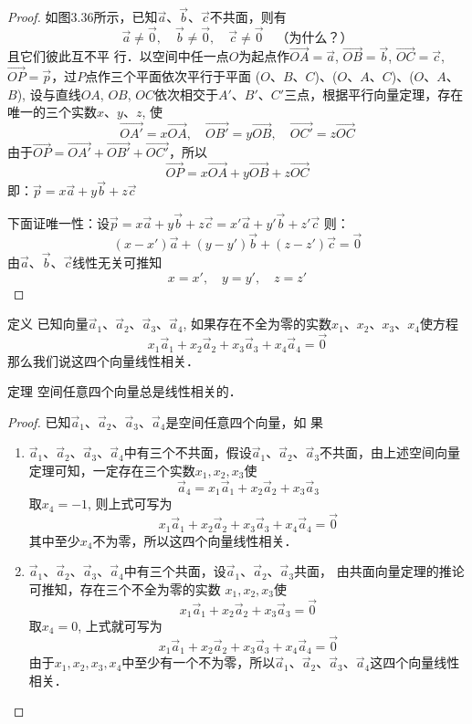 \begin{proof}
如图3.36所示，已知$\vec{a}$、$\vec{b}$、$\vec{c}$不共面，则有
\[\vec{a}\ne \vec{0},\quad \vec{b}\ne\vec{0},\quad \vec{c}\ne \vec{0}\quad \text{（为什么？）}\]
且它们彼此互不平
行．以空间中任一点$O$为起点作$\Vec{OA}=\vec{a}$, $\Vec{OB}=\vec{b}$, $\Vec{OC}=\vec{c}$, $\Vec{OP}=\vec{p}$，过$P$点作三个平面依次平行于平面
($O$、$B$、$C$)、($O$、$A$、$C$)、($O$、$A$、$B$), 设与直线$OA$, $
OB$, $OC$依次相交于$A'$、$B'$、$C'$三点，根据平行向量定理，存在
唯一的三个实数$x$、$y$、$z$, 使
\[\Vec{OA'}=x\Vec{OA},\quad \Vec{OB'}=y\Vec{OB},\quad \Vec{OC'}=z\Vec{OC}\]
由于$\Vec{OP}=\Vec{OA'}+\Vec{OB'}+\Vec{OC'}$，所以
\[\Vec{OP}=x\Vec{OA}+y\Vec{OB}+z\Vec{OC}\]
即：$\vec{p}=x\vec{a}+y\vec{b}+z\vec{c}$

下面证唯一性：设$\vec{p}=x\vec{a}+y\vec{b}+z\vec{c}=x'\vec{a}+y'\vec{b}+z'\vec{c}$
则：
\[(x-x')\vec{a}+(y-y')\vec{b}+(z-z')\vec{c}=\vec{0}\]
由$\vec{a}$、$\vec{b}$、$\vec{c}$线性无关可推知
\[x=x',\quad y=y',\quad z=z'\]
\end{proof}

\begin{blk}
    {定义} 已知向量$\vec{a}_1$、$\vec{a}_2$、$\vec{a}_3$、$\vec{a}_4$, 如果存在不全为零的实数$x_1$、$x_2$、$x_3$、$x_4$使方程
    \[x_1\vec{a}_1+x_2\vec{a}_2+x_3\vec{a}_3+x_4\vec{a}_4=\vec{0}\]
    那么我们说这四个向量线性相关．
\end{blk}

\begin{blk}
    {定理}
空间任意四个向量总是线性相关的．
\end{blk}

\begin{proof}
    已知$\vec{a}_1$、$\vec{a}_2$、$\vec{a}_3$、$\vec{a}_4$是空间任意四个向量，如
果
\begin{enumerate}
    \item $\vec{a}_1$、$\vec{a}_2$、$\vec{a}_3$、$\vec{a}_4$中有三个不共面，假设$\vec{a}_1$、$\vec{a}_2$、$\vec{a}_3$不共面，由上述空间向量定理可知，一定存在三个实数$x_1,x_2,x_3$使
\[\vec{a}_4=x_1\vec{a}_1+x_2\vec{a}_2+x_3\vec{a}_3\]
取$x_4=-1$, 则上式可写为
\[x_1\vec{a}_1+x_2\vec{a}_2+x_3\vec{a}_3+x_4\vec{a}_4=\vec{0}\]
其中至少$x_4$不为零，所以这四个向量线性相关．
\item $\vec{a}_1$、$\vec{a}_2$、$\vec{a}_3$、$\vec{a}_4$中有三个共面，设$\vec{a}_1$、$\vec{a}_2$、$\vec{a}_3$共面，
由共面向量定理的推论可推知，存在三个不全为零的实数
$x_1,x_2,x_3$使
\[x_1\vec{a}_1+x_2\vec{a}_2+x_3\vec{a}_3=\vec{0}\]
取$x_4=0$, 上式就可写为
\[x_1\vec{a}_1+x_2\vec{a}_2+x_3\vec{a}_3+x_4\vec{a}_4=\vec{0}\]
由于$x_1,x_2,x_3,x_4$中至少有一个不为零，所以$\vec{a}_1$、$\vec{a}_2$、$\vec{a}_3$、$\vec{a}_4$这四个向量线性相关．
\end{enumerate}

\end{proof}

